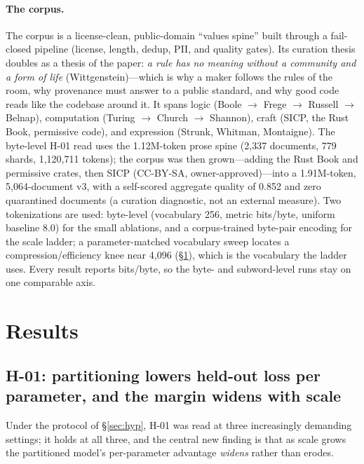 \documentclass[11pt]{article}
\begin{document}
\paragraph{The corpus.}
The corpus is a license-clean, public-domain ``values spine'' built through a fail-closed pipeline
(license, length, dedup, PII, and quality gates). Its curation thesis doubles as a thesis of the
paper: \emph{a rule has no meaning without a community and a form of life} (Wittgenstein)---which is
why a maker follows the rules of the room, why provenance must answer to a public standard, and why
good code reads like the codebase around it. It spans logic (Boole $\to$ Frege $\to$ Russell $\to$
Belnap), computation (Turing $\to$ Church $\to$ Shannon), craft (SICP, the Rust Book, permissive
code), and expression (Strunk, Whitman, Montaigne). The byte-level H-01 read uses the 1.12M-token
prose spine (2{,}337 documents, 779 shards, 1{,}120{,}711 tokens); the corpus was then grown---adding
the Rust Book and permissive crates, then SICP (CC-BY-SA, owner-approved)---into a 1.91M-token,
5{,}064-document v3, with a self-scored aggregate quality of 0.852 and zero quarantined documents (a
curation diagnostic, not an external measure). Two tokenizations are used: byte-level (vocabulary
256, metric bits/byte, uniform baseline 8.0) for the small ablations, and a corpus-trained byte-pair
encoding \citep{sennrich2016bpe} for the scale ladder; a parameter-matched vocabulary sweep locates a
compression/efficiency knee near 4{,}096 (\S\ref{sec:results}), which is the vocabulary the ladder
uses. Every result reports bits/byte, so the byte- and subword-level runs stay on one comparable
axis.

\section{Results}\label{sec:results}

\subsection{H-01: partitioning lowers held-out loss per parameter, and the margin widens with scale}
Under the protocol of \S\ref{sec:hyp}, H-01 was read at three increasingly demanding settings; it
holds at all three, and the central new finding is that as scale grows the partitioned model's
per-parameter advantage \emph{widens} rather than erodes.
\end{document}
